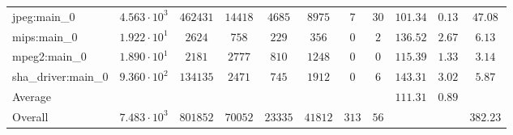 \begin{tabular}{|l|c|c|c|c|c|c|c|c|c|c|}
jpeg:main\_0            & $ 4.563 \cdot 10^{3}  $ & $ 462431 $ & $ 14418 $ & $ 4685  $ & $ 8975  $ & $ 7   $ & $ 30 $ & $ 101.34      $ & $ 0.13    $ & $ 47.08   $ \\
mips:main\_0            & $ 1.922 \cdot 10^{1}  $ & $ 2624   $ & $ 758   $ & $ 229   $ & $ 356   $ & $ 0   $ & $ 2  $ & $ 136.52      $ & $ 2.67    $ & $ 6.13    $ \\
mpeg2:main\_0           & $ 1.890 \cdot 10^{1}  $ & $ 2181   $ & $ 2777  $ & $ 810   $ & $ 1248  $ & $ 0   $ & $ 0  $ & $ 115.39      $ & $ 1.33    $ & $ 3.14    $ \\
sha\_driver:main\_0     & $ 9.360 \cdot 10^{2}  $ & $ 134135 $ & $ 2471  $ & $ 745   $ & $ 1912  $ & $ 0   $ & $ 6  $ & $ 143.31      $ & $ 3.02    $ & $ 5.87    $ \\
\hline
Average                 & $                     $ & $        $ & $       $ & $       $ & $       $ & $     $ & $    $ & $ 111.31      $ & $ 0.89    $ & $         $ \\
\hline
Overall                 & $ 7.483 \cdot 10^{3}  $ & $ 801852 $ & $ 70052 $ & $ 23335 $ & $ 41812 $ & $ 313 $ & $ 56 $ & $             $ & $         $ & $ 382.23  $ \\
\hline
\end{tabular}
